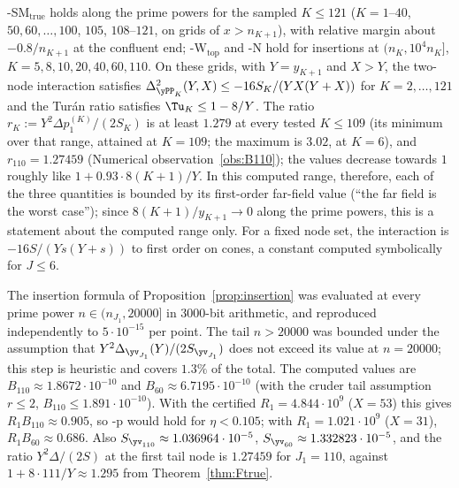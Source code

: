 \begin{observation}\label{obs:SMset-true}
\hyp{SM}$_{\mathrm{true}}$ holds along the prime powers for the sampled $K\le121$ ($K=1$--$40$, $50,60,\dots,100$, $105$,
$108$--$121$, on grids of $x>n_{K+1}$), with relative margin about $-0.8/n_{K+1}$ at the confluent end;
\hyp{W}$_{\mathrm{top}}$ and \hyp{N} hold for insertions at $(n_K,10^4n_K]$, $K=5,8,10,20,40,60,110$. On these grids, with
$Y=y_{K+1}$ and $X>Y$, the two-node interaction satisfies $\Delta^2_{\yPP_K}(Y,X)\le-16S_K/(YX(Y+X))$ for $K=2,\dots,121$ and the
Tur\'an ratio satisfies $\Tu_K\le1-8/Y$. The ratio $r_K:=Y^2\Delta p_1^{(K)}/(2S_K)$ is at least $1.279$ at every tested
$K\le109$ (its minimum over that range, attained at $K=109$; the maximum is $3.02$, at $K=6$), and $r_{110}=1.27459$
(Numerical observation~\ref{obs:B110}); the values decrease towards $1$ roughly like $1+0.93\cdot8(K+1)/Y$. In this
computed range, therefore, each of the three quantities is bounded by its first-order far-field value (``the far field is
the worst case''); since $8(K+1)/y_{K+1}\to0$ along the prime powers, this is a statement about the computed range only.
For a fixed node set, the interaction is $-16S/(Ys(Y+s))$ to first order on cones, a constant computed symbolically for
$J\le6$.
\end{observation}

\begin{observation}\label{obs:B110}
The insertion formula of Proposition~\ref{prop:insertion} was evaluated at every prime power
$n\in(n_{J_1},20000]$ in 3000-bit arithmetic, and reproduced independently to $5\cdot10^{-15}$ per point. The tail
$n>20000$ was bounded under the assumption that $Y^2\Delta_{\yv_{J_1}}(Y)/(2S_{\yv_{J_1}})$ does not exceed its value at
$n=20000$; this step is heuristic and covers $1.3\%$ of the total. The computed values are
$B_{110}\approx1.8672\cdot10^{-10}$ and $B_{60}\approx6.7195\cdot10^{-10}$ (with the cruder tail assumption $r\le2$,
$B_{110}\le1.891\cdot10^{-10}$). With the certified $R_1=4.844\cdot10^9$ ($X=53$) this gives $R_1B_{110}\approx0.905$, so
\hyp{p} would hold for $\eta<0.105$; with $R_1=1.021\cdot10^9$ ($X=31$), $R_1B_{60}\approx0.686$. Also
$S_{\yv_{110}}\approx1.036964\cdot10^{-5}$, $S_{\yv_{60}}\approx1.332823\cdot10^{-5}$, and the ratio $Y^2\Delta/(2S)$ at the
first tail node is $1.27459$ for $J_1=110$, against $1+8\cdot111/Y\approx1.295$ from Theorem~\ref{thm:Ftrue}.
\end{observation}


